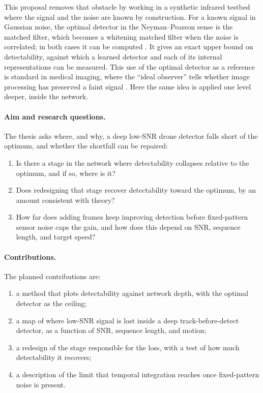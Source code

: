 \documentclass[11pt]{article}
\begin{document}
This proposal removes that obstacle by working in a synthetic infrared testbed
where the signal and the noise are known by construction. For a known signal in
Gaussian noise, the optimal detector in the Neyman--Pearson sense is the matched
filter, which becomes a whitening matched filter when the noise is correlated;
in both cases it can be computed \cite{kay,marcum}. It gives an exact upper bound
on detectability, against which a learned detector and each of its internal
representations can be measured. This use of the optimal detector as a reference
is standard in medical imaging, where the ``ideal observer'' tells whether image
processing has preserved a faint signal \cite{barrett}. Here the same idea is
applied one level deeper, inside the network.

\paragraph{Aim and research questions.} The thesis asks where, and why, a deep
low-SNR drone detector falls short of the optimum, and whether the shortfall can
be repaired:
\begin{enumerate}
\item[Q1.] Is there a stage in the network where detectability collapses relative
to the optimum, and if so, where is it?
\item[Q2.] Does redesigning that stage recover detectability toward the optimum,
by an amount consistent with theory?
\item[Q3.] How far does adding frames keep improving detection before
fixed-pattern sensor noise caps the gain, and how does this depend on SNR,
sequence length, and target speed?
\end{enumerate}

\paragraph{Contributions.} The planned contributions are:
\begin{enumerate}
\item[C1.] a method that plots detectability against network depth, with the
optimal detector as the ceiling;
\item[C2.] a map of where low-SNR signal is lost inside a deep
track-before-detect detector, as a function of SNR, sequence length, and motion;
\item[C3.] a redesign of the stage responsible for the loss, with a test of how
much detectability it recovers;
\item[C4.] a description of the limit that temporal integration reaches once
fixed-pattern noise is present.
\end{enumerate}
\end{document}
